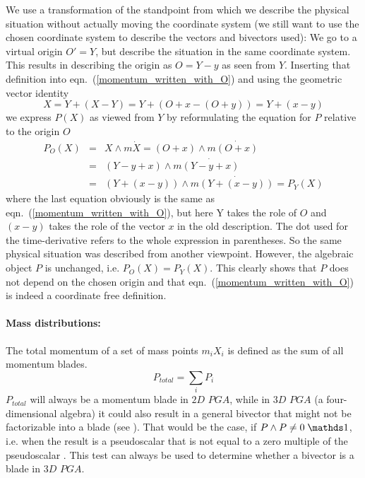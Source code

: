 We use a transformation of the standpoint from which we describe the
physical situation without actually moving the coordinate system (we still want to use the
chosen coordinate system to describe the vectors and bivectors used): We go to a virtual
origin $O' = Y$, but describe the situation in the same coordinate system. This results in
describing the origin as $O = Y - y$ as seen from $Y$. Inserting that definition into
eqn.~(\ref{momentum_written_with_O}) and using the geometric vector identity
\begin{equation}
X = Y + (X-Y) = Y + (O+x-(O+y)) = Y + (x-y)
\label{eq:identity_transformation_X_Y}
\end{equation}
we express $P(X)$ as viewed from $Y$ by reformulating the equation for $P$ relative to the
origin $O$
\begin{eqnarray}
    P_O(X) &=& X \wedge m \dot{X} = (O + x) \wedge m \dot{(O + x)} \nonumber \\
           &=& (Y - y + x) \wedge m \dot{(Y - y + x)} \nonumber \\
           &=& (Y + (x-y)) \wedge m \dot{(Y + (x - y))} = P_Y(X)
\end{eqnarray}
where the last equation obviously is the same as eqn.~(\ref{momentum_written_with_O}), but
here Y takes the role of $O$ and $(x-y)$ takes the role of the vector $x$ in the old
description. The dot used for the time-derivative refers to the whole expression in
parentheses. So the same physical situation was described from another viewpoint. However,
the algebraic object $P$ is unchanged, i.e. $P_O(X) = P_Y(X)$. This clearly shows that $P$
does not depend on the chosen origin and that eqn.~(\ref{momentum_written_with_O}) is
indeed a coordinate free definition.

\paragraph{Mass distributions:}
The total momentum of a set of mass points $m_i X_i$ is defined as the sum of all momentum
blades.
\begin{equation}
    P_{total} = \sum_i{P_i}
    \label{eq:total_sum_momentum}
\end{equation}
$P_{total}$ will always be a momentum blade in $2D$ $PGA$, while in $3D$ $PGA$ (a
four-dimensional algebra) it could also result in a general bivector that might not be
factorizable into a blade (see \cite{Browne_Grassmann-Algebra_Vol1:2012}). That would be
the case, if $P \wedge P \ne 0 \; \ps$, i.e. when the result is a pseudoscalar that is not
equal to a zero multiple of the pseudoscalar . This test can always be used to
determine whether a bivector is a blade in $3D$ $PGA$. \\

